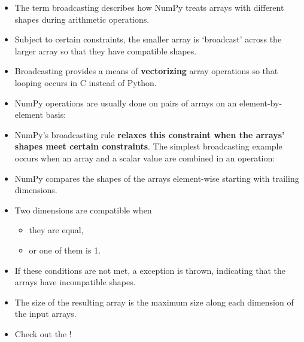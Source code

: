 \begin{frame}
	\begin{itemize}
		\item The term broadcasting describes how NumPy treats arrays with different shapes during arithmetic operations.
		\item Subject to certain constraints, the smaller array is `broadcast' across the larger array so that they have compatible shapes.
		\item Broadcasting provides a means of \textbf{vectorizing} array operations so that looping occurs in C instead of Python.
		\item NumPy operations are usually done on pairs of arrays on an element-by-element basis:
	\end{itemize}
	
	\begin{itemize}
		\item NumPy’s broadcasting rule \textbf{relaxes this constraint when the arrays’ shapes meet certain constraints}.
		The simplest broadcasting example occurs when an array and a scalar value are combined in an operation:
	\end{itemize}
	
\end{frame}


\begin{frame}
	\begin{itemize}
		\item NumPy compares the shapes of the arrays element-wise starting with trailing dimensions.
		\item Two dimensions are compatible when
		\begin{itemize}
			\item they are equal,
			\item or one of them is 1.
		\end{itemize}
		\item If these conditions are not met, a  exception is thrown,
			indicating that the arrays have incompatible shapes.
		\item The size of the resulting array is the maximum size along each dimension of the input arrays.
		\item Check out the !
	\end{itemize}
\end{frame}



